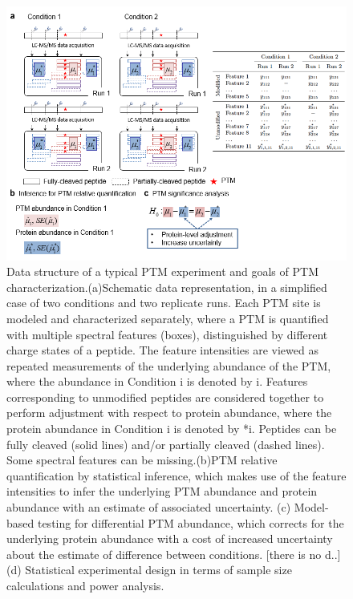 \documentclass[mcp]{article}
\numberwithin{figure}{section} %
\numberwithin{table}{section}
\def\todo#1{{\color{red}[#1]}}
\begin{document}
\begin{figure}[ht]
\centering
\includegraphics[scale=.8]{images/fig3.png}
\caption{
Data structure of a typical PTM experiment and goals of PTM characterization.(a)Schematic data representation, in a simplified case of two conditions and two replicate runs. Each PTM site is modeled and characterized separately, where a PTM is quantified with multiple spectral features (boxes), distinguished by different charge states of a peptide. The feature intensities are viewed as repeated measurements of the underlying abundance of the PTM, where the abundance in Condition i is denoted by i. Features corresponding to unmodified peptides are considered together to perform adjustment with respect to protein abundance, where the protein abundance in Condition i is denoted by *i. Peptides can be fully cleaved (solid lines) and/or partially cleaved (dashed lines). Some spectral features can be missing.(b)PTM relative quantification by statistical inference, which makes use of the feature intensities to infer the underlying PTM abundance and protein abundance with an estimate of associated uncertainty. (c) Model-based testing for differential PTM abundance, which corrects for the underlying protein abundance with a cost of increased uncertainty about the estimate of difference between conditions. \todo{there is no d..}(d) Statistical experimental design in terms of sample size calculations and power analysis.}
\label{fig:data-structure}
\end{figure}
\end{document}

